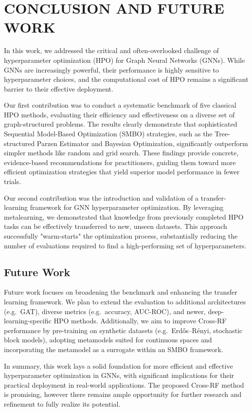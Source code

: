 \section{\uppercase{Conclusion and Future work}}
\label{sec:conclusion}

In this work, we addressed the critical and often-overlooked challenge of hyperparameter optimization (HPO) for Graph Neural Networks (GNNs). While GNNs are increasingly powerful, their performance is highly sensitive to hyperparameter choices, and the computational cost of HPO remains a significant barrier to their effective deployment.

Our first contribution was to conduct a systematic benchmark of five classical HPO methods, evaluating their efficiency and effectiveness on a diverse set of graph-structured problems. The results clearly demonstrate that sophisticated Sequential Model-Based Optimization (SMBO) strategies, such as the Tree-structured Parzen Estimator and Bayesian Optimization, significantly outperform simpler methods like random and grid search. These findings provide concrete, evidence-based recommendations for practitioners, guiding them toward more efficient optimization strategies that yield superior model performance in fewer trials.

Our second contribution was the introduction and validation of a transfer-learning framework for GNN hyperparameter optimization. By leveraging metalearning, we demonstrated that knowledge from previously completed HPO tasks can be effectively transferred to new, unseen datasets. This approach successfully "warm-starts" the optimization process, substantially reducing the number of evaluations required to find a high-performing set of hyperparameters.

\subsection{Future Work}
Future work focuses on broadening the benchmark and enhancing the transfer learning framework. We plan to extend the evaluation to additional architectures (e.g.\ GAT), diverse metrics (e.g.\ accuracy, AUC-ROC), and newer, deep-learning-specific HPO methods. Additionally, we aim to improve Cross-RF performance by pre-training on synthetic datasets (e.g.\ Erdős–Rényi, stochastic block models), adopting metamodels suited for continuous spaces and incorporating the metamodel as a surrogate within an SMBO framework.

In summary, this work lays a solid foundation for more efficient and effective hyperparameter optimization in GNNs, with significant implications for their practical deployment in real-world applications. The proposed Cross-RF method is promising, however there remains ample opportunity for further research and refinement to fully realize its potential.
